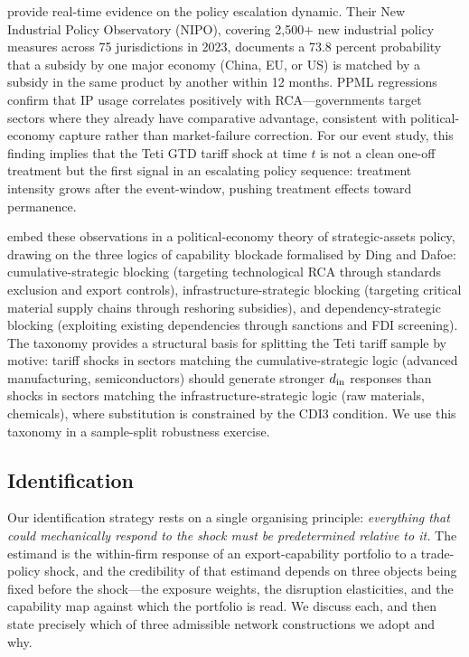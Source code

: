 \citet{evenett2024} provide real-time evidence on the policy escalation dynamic. Their
New Industrial Policy Observatory (NIPO), covering 2,500$+$ new industrial policy
measures across 75 jurisdictions in 2023, documents a 73.8 percent probability that a
subsidy by one major economy (China, EU, or US) is matched by a subsidy in the same
product by another within 12 months. PPML regressions confirm that IP usage correlates
positively with RCA---governments target sectors where they already have comparative
advantage, consistent with political-economy capture rather than market-failure
correction. For our event study, this finding implies that the Teti GTD tariff
shock at time $t$ is not a clean one-off treatment but the first signal in an
escalating policy sequence: treatment intensity grows after the event-window, pushing
treatment effects toward permanence.

\citet{fontana2024} embed these observations in a political-economy theory of
strategic-assets policy, drawing on the three logics of capability blockade formalised
by Ding and Dafoe: cumulative-strategic blocking (targeting technological RCA through
standards exclusion and export controls), infrastructure-strategic blocking (targeting
critical material supply chains through reshoring subsidies), and dependency-strategic
blocking (exploiting existing dependencies through sanctions and FDI screening). The
taxonomy provides a structural basis for splitting the Teti tariff sample by motive:
tariff shocks in sectors matching the cumulative-strategic logic (advanced
manufacturing, semiconductors) should generate stronger $d_{\rm in}$ responses than
shocks in sectors matching the infrastructure-strategic logic (raw materials, chemicals),
where substitution is constrained by the CDI3 condition. We use this taxonomy in a
sample-split robustness exercise.

\subsection{Identification}
\label{subsec:lit_id}

Our identification strategy rests on a single organising principle: \emph{everything
that could mechanically respond to the shock must be predetermined relative to it.}
The estimand is the within-firm response of an export-capability portfolio to a
trade-policy shock, and the credibility of that estimand depends on three objects
being fixed before the shock---the exposure weights, the disruption elasticities, and
the capability map against which the portfolio is read. We discuss each, and then
state precisely which of three admissible network constructions we adopt and why.

